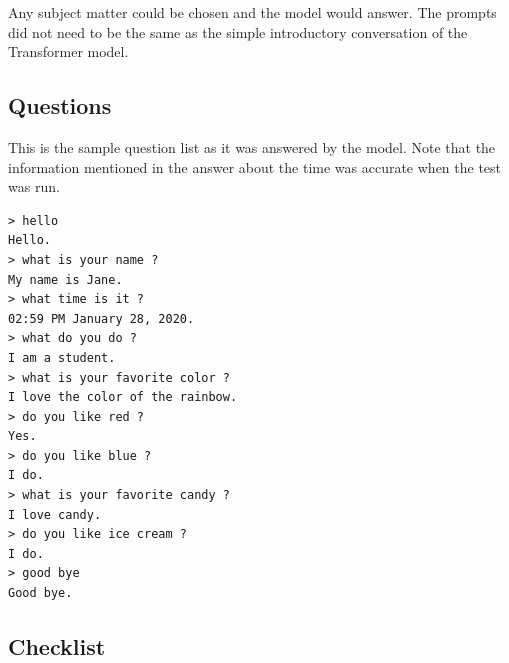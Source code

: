 Any subject matter could be chosen and the model would answer. The prompts did not need to be the same as the simple introductory conversation of the Transformer model. 

\subsection{Questions}
This is the sample question list as it was answered by the model. Note that the information mentioned in the answer about the time was accurate when the test was run.

\begin{verbatim}
> hello
Hello.
> what is your name ?
My name is Jane.
> what time is it ?
02:59 PM January 28, 2020.
> what do you do ?
I am a student.
> what is your favorite color ?
I love the color of the rainbow.
> do you like red ?
Yes.
> do you like blue ?
I do.
> what is your favorite candy ?
I love candy.
> do you like ice cream ?
I do. 
> good bye
Good bye.
\end{verbatim}


\subsection{Checklist}

